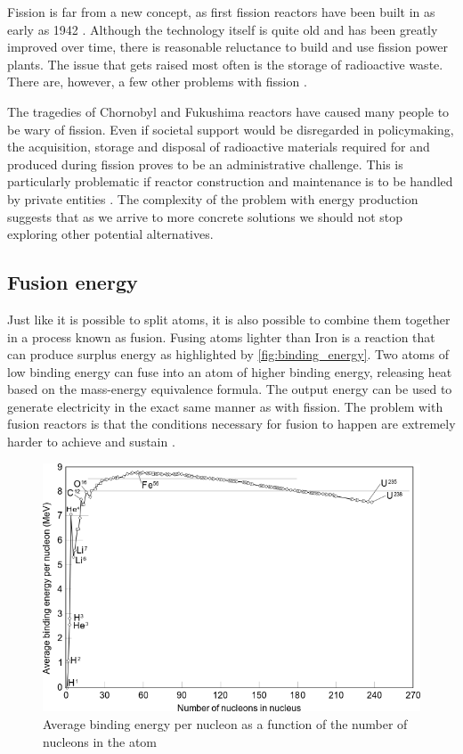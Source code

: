   Fission is far from a new concept, as first fission reactors have been 
  built in as early as 1942 \cite{first_fission_reactor}. 
  Although the technology itself is quite old 
  and has been greatly improved over time, 
  there is reasonable reluctance to build and use fission power plants. 
  The issue that gets raised most often is the storage of radioactive waste. 
  There are, however, a few other problems with fission \cite{fission_problems}. 


  The tragedies of Chornobyl and Fukushima reactors
  have caused many people to be wary of fission. Even if
  societal support would be disregarded in policymaking, the acquisition,
  storage and disposal of radioactive materials required for and produced 
  during fission proves to be an administrative challenge.
  This is particularly problematic 
  if reactor construction and maintenance is to be handled
  by private entities \cite{fission_tech_and_current_issues}. 
  The complexity of the problem with energy production suggests that 
  as we arrive to more concrete solutions we 
  should not stop exploring other potential alternatives.

\subsection{Fusion energy}

  Just like it is possible to split atoms, it is also possible to
  combine them together in a process known as fusion. 
  Fusing atoms lighter than Iron is a reaction that 
  can produce surplus energy as highlighted by \autoref{fig:binding_energy}.
  Two atoms of low binding energy can fuse into an atom of higher 
  binding energy, releasing heat based on the mass-energy equivalence formula.
  The output energy can be used to generate electricity in
  the exact same manner as with fission. 
  The problem with fusion reactors is that the conditions necessary
  for fusion to happen are extremely harder to achieve and sustain 
  \cite{structural_materials_fusion}.

  \begin{figure}[H]
	\centering
	\includegraphics[width=.90\linewidth]{media/binding_energy.png}
	\caption{Average binding energy per nucleon as a function of the number of nucleons in the atom}
	\label{fig:binding_energy}
  \end{figure}

